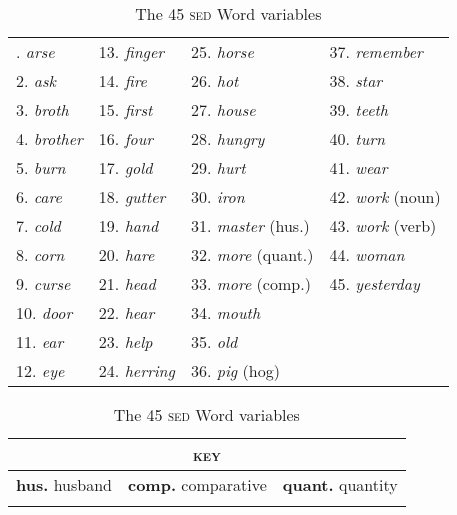 \begin{enumerate}
{\begin{table} 
\begin{tabularx}{\textwidth}{XXXX}
\lsptoprule
1. \textit{arse} & 13. \textit{finger} & 25. \textit{horse} & 37. \textit{remember}  \\
2. \textit{ask} & 14. \textit{fire} & 26. \textit{hot} & 38. \textit{star}  \\  
3. \textit{broth} & 15. \textit{first} & 27. \textit{house} & 39. \textit{teeth}  \\ 
4. \textit{brother} & 16. \textit{four} & 28. \textit{hungry} & 40. \textit{turn}  \\  
5. \textit{burn} & 17. \textit{gold} & 29. \textit{hurt} & 41. \textit{wear}  \\  
6. \textit{care} & 18. \textit{gutter} & 30. \textit{iron} & 42. \textit{work} (noun)  \\  
7. \textit{cold} & 19. \textit{hand} & 31. \textit{master} (hus.) & 43. \textit{work} (verb)  \\  
8. \textit{corn} & 20. \textit{hare} & 32. \textit{more} (quant.) & 44. \textit{woman}  \\  
9. \textit{curse} & 21. \textit{head} & 33. \textit{more} (comp.) & 45. \textit{yesterday}  \\  
10. \textit{door} & 22. \textit{hear} & 34. \textit{mouth} \\  
11. \textit{ear} & 23. \textit{help} & 35. \textit{old}  \\  
12. \textit{eye} & 24. \textit{herring} & 36. \textit{pig} (hog) \\   
\midrule
\end{tabularx}\newline
\begin{tabularx}{\textwidth}{XXX}
\multicolumn{3}{c}{\textsc{key}}\\\midrule
\textbf{hus.}   husband  & \textbf{comp.}   comparative & \textbf{quant.}   quantity \\
\lspbottomrule 
\end{tabularx} 
\caption{The 45 \textsc{sed} Word variables}
\label{Table 3.1}
\end{table}
}


\end{enumerate}
